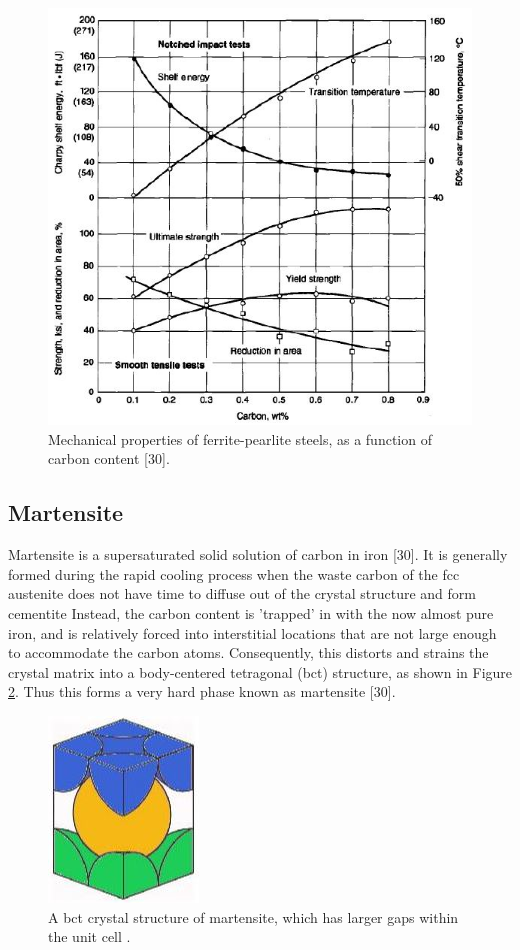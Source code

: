 \documentclass[12pt]{report}
\begin{document}
\begin{figure}[H]
    \centering
    \includegraphics[width=.8\textwidth]{mechanical_properties_of_ferrite-pearlite_steels.jpg}
    \caption{Mechanical properties of ferrite-pearlite steels, as a function of carbon content [30]. }
    \label{ch3:figure:properties}
\end{figure}

\subsection{Martensite}
Martensite is a supersaturated solid solution of carbon in iron [30]. It is generally formed during the rapid cooling process when the waste carbon of the fcc austenite does not have time to diffuse out of the crystal structure and form cementite \cite{bajaj2020steels} Instead, the carbon content is 'trapped' in with the now almost pure iron, and is relatively forced into interstitial locations that are not large enough to accommodate the carbon atoms. Consequently, this distorts and strains the crystal matrix into a body-centered tetragonal (bct) structure, as shown in Figure \ref{ch3:figure:martensite}. Thus this forms a very hard phase known as martensite [30].
 
\begin{figure}[H]
    \centering
    \includegraphics[width=.25\textwidth]{bct_crystal_structure_of_martensite.jpg}
    \caption{A bct crystal structure of martensite, which has larger gaps within the unit cell \cite{bajaj2020steels}.}
    \label{ch3:figure:martensite}
\end{figure}
\end{document}
